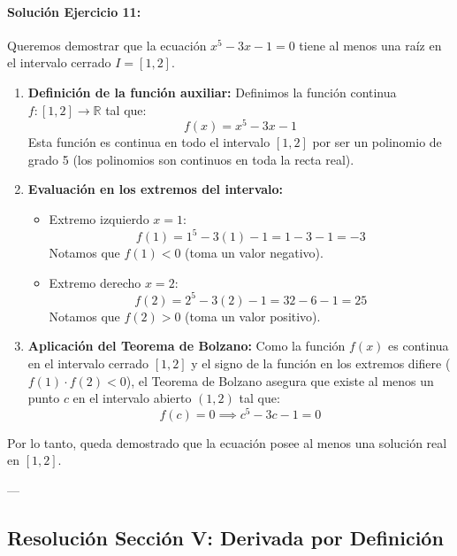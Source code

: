 \documentclass[11pt,letterpaper]{article}
\begin{document}
\paragraph{Solución Ejercicio 11:}
Queremos demostrar que la ecuación $x^5 - 3x - 1 = 0$ tiene al menos una raíz en el intervalo cerrado $I = [1, 2]$.
\begin{enumerate}
    \item \textbf{Definición de la función auxiliar:} Definimos la función continua $f: [1, 2] \to \mathbb{R}$ tal que:
    $$f(x) = x^5 - 3x - 1$$
    Esta función es continua en todo el intervalo $[1, 2]$ por ser un polinomio de grado 5 (los polinomios son continuos en toda la recta real).
    \item \textbf{Evaluación en los extremos del intervalo:}
    \begin{itemize}
        \item Extremo izquierdo $x = 1$:
        $$f(1) = 1^5 - 3(1) - 1 = 1 - 3 - 1 = -3$$
        Notamos que $f(1) < 0$ (toma un valor negativo).
        \item Extremo derecho $x = 2$:
        $$f(2) = 2^5 - 3(2) - 1 = 32 - 6 - 1 = 25$$
        Notamos que $f(2) > 0$ (toma un valor positivo).
    \end{itemize}
    \item \textbf{Aplicación del Teorema de Bolzano:} Como la función $f(x)$ es continua en el intervalo cerrado $[1, 2]$ y el signo de la función en los extremos difiere ($f(1) \cdot f(2) < 0$), el Teorema de Bolzano asegura que existe al menos un punto $c$ en el intervalo abierto $(1, 2)$ tal que:
    $$f(c) = 0 \implies c^5 - 3c - 1 = 0$$
\end{enumerate}
Por lo tanto, queda demostrado que la ecuación posee al menos una solución real en $[1, 2]$.

---

\subsection{Resolución Sección V: Derivada por Definición}
\end{document}
